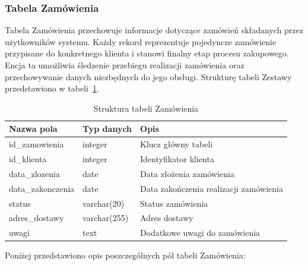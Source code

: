 \documentclass[a4paper,twoside,12pt]{book}
\begin{document}
\newpage 
\subsubsection{Tabela Zamówienia}
Tabela Zamówienia przechowuje informacje dotyczące zamówień składanych przez
użytkowników systemu. Każdy rekord reprezentuje pojedyncze zamówienie przypisane
do konkretnego klienta i stanowi finalny etap procesu zakupowego. Encja ta
umożliwia śledzenie przebiegu realizacji zamówienia oraz przechowywanie danych
niezbędnych do jego obsługi. Strukturę tabeli Zestawy przedstawiono w tabeli~\ref{tab:zamowienia}.

\begin{table}[H]
\centering
\caption{Struktura tabeli Zamówienia}
\label{tab:zamowienia}
\begin{tabular}{lll}
\hline
Nazwa pola & Typ danych & Opis \\ \hline
id\_zamowienia & integer & Klucz główny tabeli \\
id\_klienta & integer & Identyfikator klienta \\
data\_zlozenia & date & Data złożenia zamówienia \\
data\_zakonczenia & date & Data zakończenia realizacji zamówienia \\
status & varchar(20) & Status zamówienia \\
adres\_dostawy & varchar(255) & Adres dostawy \\
uwagi & text & Dodatkowe uwagi do zamówienia \\ \hline
\end{tabular}
\end{table}

Poniżej przedstawiono opis poszczególnych pól tabeli Zamówienia:
\end{document}
